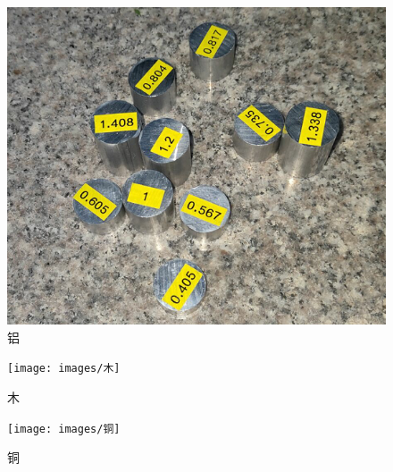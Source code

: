 \documentclass[UTF8]{gapd}
\begin{document}
\begin{figure}[H]%
	\centering
	\includegraphics[width=1\columnwidth]{images/铝}
	\caption{铝}
	\label{fig:P2}%
\end{figure}
\begin{figure}[H]%
	\centering
	\texttt{[image: images/木]}
	\caption{木}
	\label{fig:P2}%
\end{figure}
\begin{figure}[H]%
	\centering
	\texttt{[image: images/铜]}
	\caption{铜}
	\label{fig:P2}%
\end{figure}
\end{document}
